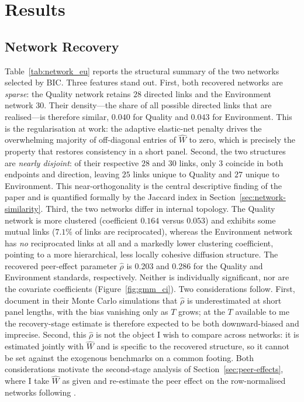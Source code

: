 \documentclass[12pt,a4paper]{article}
\begin{document}
\clearpage

\section{Results}
\label{sec:results}

\subsection{Network Recovery}
\label{sec:network-recovery}


Table~\ref{tab:network_eu} reports the structural summary of the two networks selected by BIC. Three features stand out. First, both recovered networks are \emph{sparse}: the Quality network retains $28$ directed links and the Environment network $30$. Their density---the share of all possible directed links that are realised---is therefore similar, $0.040$ for Quality and $0.043$ for Environment. This is the regularisation at work: the adaptive elastic-net penalty drives the overwhelming majority of off-diagonal entries of $\hat W$ to zero, which is precisely the property that restores consistency in a short panel. Second, the two structures are \emph{nearly disjoint}: of their respective $28$ and $30$ links, only $3$ coincide in both endpoints and direction, leaving $25$ links unique to Quality and $27$ unique to Environment. This near-orthogonality is the central descriptive finding of the paper and is quantified formally by the Jaccard index in Section~\ref{sec:network-similarity}. Third, the two networks differ in internal topology. The Quality network is more clustered (coefficient $0.164$ versus $0.053$) and exhibits some mutual links ($7.1\%$ of links are reciprocated), whereas the Environment network has \emph{no} reciprocated links at all and a markedly lower clustering coefficient, pointing to a more hierarchical, less locally cohesive diffusion structure. The recovered peer-effect parameter $\hat\rho$ is 0.203 and 0.286 for the Quality and Environment standards, respectively. Neither is individually significant, nor are the covariate coefficients (Figure~\ref{fig:gmm_ci}). Two considerations follow. First, \citet{depaula2025} document in their Monte Carlo simulations that $\hat\rho$ is underestimated at short panel lengths, with the bias vanishing only as $T$ grows; at the $T$ available to me the recovery-stage estimate is therefore expected to be both downward-biased and imprecise. Second, this $\hat\rho$ is not the object I wish to compare across networks: it is estimated jointly with $\hat{W}$ and is specific to the recovered structure, so it cannot be set against the exogenous benchmarks on a common footing. Both considerations motivate the second-stage analysis of Section~\ref{sec:peer-effects}, where I take $\hat{W}$ as given and re-estimate the peer effect on the row-normalised networks following \citet{bramoulle2009}.
\end{document}
